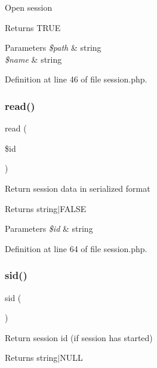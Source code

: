Open session \begin{DoxyReturn}{Returns}
T\+R\+UE 
\end{DoxyReturn}

\begin{DoxyParams}{Parameters}
{\em \$path} & string \\
\hline
{\em \$name} & string \\
\hline
\end{DoxyParams}


Definition at line 46 of file session.\+php.

\hypertarget{class_session_afa59bebedda70c37b94c2efc35da83f3}{}\label{class_session_afa59bebedda70c37b94c2efc35da83f3} 
\subsubsection{\texorpdfstring{read()}{read()}}
{\footnotesize\ttfamily read (\begin{DoxyParamCaption}\item[{}]{\$id }\end{DoxyParamCaption})}

Return session data in serialized format \begin{DoxyReturn}{Returns}
string$\vert$\+F\+A\+L\+SE 
\end{DoxyReturn}

\begin{DoxyParams}{Parameters}
{\em \$id} & string \\
\hline
\end{DoxyParams}


Definition at line 64 of file session.\+php.

\hypertarget{class_session_a30b416c35150ab6bdde364f527f612bd}{}\label{class_session_a30b416c35150ab6bdde364f527f612bd} 
\subsubsection{\texorpdfstring{sid()}{sid()}}
{\footnotesize\ttfamily sid (\begin{DoxyParamCaption}{ }\end{DoxyParamCaption})}

Return session id (if session has started) \begin{DoxyReturn}{Returns}
string$\vert$\+N\+U\+LL 
\end{DoxyReturn}


